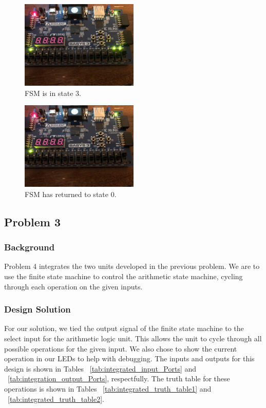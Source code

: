 \documentclass[11pt]{article}
\begin{document}
\begin{figure}[H]
\begin{center}
	\includegraphics[width=0.5\textwidth]{./images/p2/IMG_1522.jpg}
	\caption{\label{fig:fsm_res4}FSM is in state 3.}
\end{center}
\end{figure}

\begin{figure}[H]
\begin{center}
	\includegraphics[width=0.5\textwidth]{./images/p2/IMG_1246.jpg}
	\caption{\label{fig:fsm_res5}FSM has returned to state 0.}
\end{center}
\end{figure}

\subsection{Problem 3}

\subsubsection{Background}
Problem 4 integrates the two units developed in the previous problem. We are to use the finite state machine to control the arithmetic state machine, cycling through each operation on the given inputs.

\subsubsection{Design Solution}
For our solution, we tied the output signal of the finite state machine to the select input for the arithmetic logic unit. This allows the unit to cycle through all possible operations for the given input. We also chose to show the current operation in our LEDs to help with debugging. The inputs and outputs for this design is shown in Tables ~\ref{tab:integrated_input_Ports} and ~\ref{tab:integration_output_Ports}, respectfully. The truth table for these operations is shown in Tables ~\ref{tab:integrated_truth_table1} and ~\ref{tab:integrated_truth_table2}.
\end{document}
